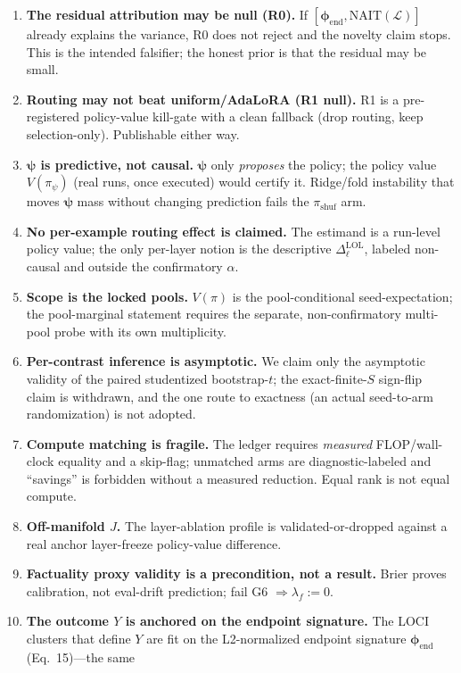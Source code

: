 \documentclass[11pt]{article}
\theoremstyle{definition}
\newcommand{\phend}{\bm{\phi}_{\mathrm{end}}}
\newcommand{\Lset}{\mathcal{L}}
\newcommand{\psivec}{\bm{\psi}}
\newcommand{\Vpol}{V}
\begin{document}
\begin{enumerate}[leftmargin=1.5em,itemsep=2pt]
\item \textbf{The residual attribution may be null (R0).} If $[\phend,\mathrm{NAIT}(\Lset)]$
already explains the variance, R0 does not reject and the novelty claim stops. This is the
intended falsifier; the honest prior is that the residual may be small.
\item \textbf{Routing may not beat uniform/AdaLoRA (R1 null).} R1 is a pre-registered
policy-value kill-gate with a clean fallback (drop routing, keep selection-only). Publishable
either way.
\item \textbf{$\psivec$ is predictive, not causal.} $\psivec$ only \emph{proposes} the
policy; the policy value $\Vpol(\pi_\psi)$ (real runs, once executed) would certify it. Ridge/fold instability
that moves $\psivec$ mass without changing prediction fails the $\pi_{\mathrm{shuf}}$ arm.
\item \textbf{No per-example routing effect is claimed.} The estimand is a run-level policy
value; the only per-layer notion is the descriptive $\Delta_\ell^{\mathrm{LOL}}$, labeled
non-causal and outside the confirmatory $\alpha$.
\item \textbf{Scope is the locked pools.} $\Vpol(\pi)$ is the pool-conditional
seed-expectation; the pool-marginal statement requires the separate, non-confirmatory
multi-pool probe with its own multiplicity.
\item \textbf{Per-contrast inference is asymptotic.} We claim only the asymptotic validity of
the paired studentized bootstrap-$t$; the exact-finite-$S$ sign-flip claim is withdrawn, and
the one route to exactness (an actual seed-to-arm randomization) is not adopted.
\item \textbf{Compute matching is fragile.} The ledger requires \emph{measured} FLOP/wall-clock
equality and a skip-flag; unmatched arms are diagnostic-labeled and ``savings'' is forbidden
without a measured reduction. Equal rank is not equal compute.
\item \textbf{Off-manifold $J$.} The layer-ablation profile is validated-or-dropped against a
real anchor layer-freeze policy-value difference.
\item \textbf{Factuality proxy validity is a precondition, not a result.} Brier proves
calibration, not eval-drift prediction; fail G6 $\Rightarrow\lambda_f:=0$.
\item \textbf{The outcome $Y$ is anchored on the endpoint signature.} The LOCI clusters that
define $Y$ are fit on the L2-normalized endpoint signature $\phend$ (Eq.~15)---the same

\end{enumerate}
\end{document}
